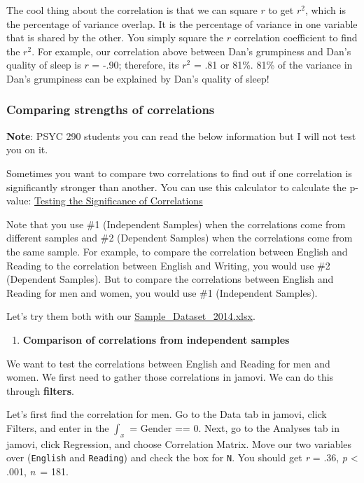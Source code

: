\documentclass[
]{book}
\providecommand{\tightlist}{%
  \setlength{\itemsep}{0pt}\setlength{\parskip}{0pt}}
\begin{document}
The cool thing about the correlation is that we can square \(r\) to get \(r^2\), which is the percentage of variance overlap. It is the percentage of variance in one variable that is shared by the other. You simply square the \(r\) correlation coefficient to find the \(r^2\). For example, our correlation above between Dan's grumpiness and Dan's quality of sleep is \(r\) = -.90; therefore, its \(r^2\) = .81 or 81\%. 81\% of the variance in Dan's grumpiness can be explained by Dan's quality of sleep!

\hypertarget{comparing-strengths-of-correlations}{%
\subsubsection{Comparing strengths of correlations}\label{comparing-strengths-of-correlations}}

\textbf{Note}: PSYC 290 students you can read the below information but I will not test you on it.

Sometimes you want to compare two correlations to find out if one correlation is significantly stronger than another. You can use this calculator to calculate the p-value: \href{https://www.psychometrica.de/correlation.html}{Testing the Significance of Correlations}

Note that you use \#1 (Independent Samples) when the correlations come from different samples and \#2 (Dependent Samples) when the correlations come from the same sample. For example, to compare the correlation between English and Reading to the correlation between English and Writing, you would use \#2 (Dependent Samples). But to compare the correlations between English and Reading for men and women, you would use \#1 (Independent Samples).

Let's try them both with our \href{https://github.com/danawanzer/stats-with-jamovi/blob/master/data/Sample_Dataset_2014.xlsx}{Sample\_Dataset\_2014.xlsx}.

\begin{enumerate}
\def\labelenumi{\arabic{enumi}.}
\tightlist
\item
  \textbf{Comparison of correlations from independent samples}
\end{enumerate}

We want to test the correlations between English and Reading for men and women. We first need to gather those correlations in jamovi. We can do this through \textbf{filters}.

Let's first find the correlation for men. Go to the Data tab in jamovi, click Filters, and enter in the \(\int_x\) = Gender == 0. Next, go to the Analyses tab in jamovi, click Regression, and choose Correlation Matrix. Move our two variables over (\texttt{English} and \texttt{Reading}) and check the box for \texttt{N}. You should get \emph{r} = .36, \emph{p} \textless{} .001, \emph{n}~= 181.
\end{document}
